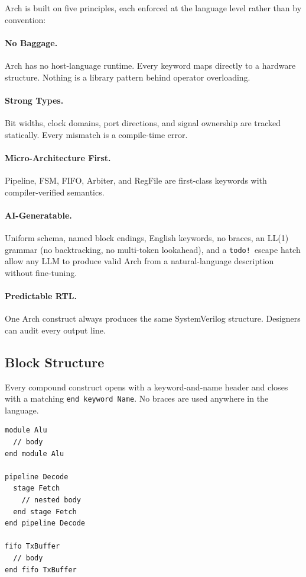 \documentclass[11pt,twocolumn]{article}
\begin{document}
Arch is built on five principles, each enforced at the language level rather than by convention:

\paragraph{No Baggage.} Arch has no host-language runtime. Every keyword maps directly to a hardware structure. Nothing is a library pattern behind operator overloading.

\paragraph{Strong Types.} Bit widths, clock domains, port directions, and signal ownership are tracked statically. Every mismatch is a compile-time error.

\paragraph{Micro-Architecture First.} Pipeline, FSM, FIFO, Arbiter, and RegFile are first-class keywords with compiler-verified semantics.

\paragraph{AI-Generatable.} Uniform schema, named block endings, English keywords, no braces, an LL(1) grammar (no backtracking, no multi-token lookahead), and a \texttt{todo!}\ escape hatch allow any LLM to produce valid Arch from a natural-language description without fine-tuning.

\paragraph{Predictable RTL.} One Arch construct always produces the same SystemVerilog structure. Designers can audit every output line.

\subsection{Block Structure}

Every compound construct opens with a keyword-and-name header and closes with a matching \texttt{end keyword Name}. No braces are used anywhere in the language.

\begin{lstlisting}[language=Arch,caption={Universal block grammar},label={lst:block}]
module Alu
  // body
end module Alu

pipeline Decode
  stage Fetch
    // nested body
  end stage Fetch
end pipeline Decode

fifo TxBuffer
  // body
end fifo TxBuffer
\end{lstlisting}
\end{document}
